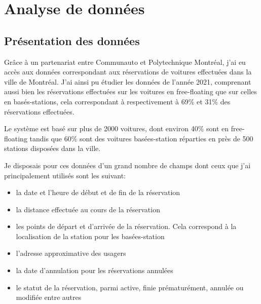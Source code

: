 \documentclass[12pt,a4paper]{article}
\newcommand{\1}[1]{\mathbbm{1}_{\{#1\}} }
\theoremstyle{definition}
\begin{document}
\section{Analyse de données}
\subsection{Présentation des données}

Grâce à un partenariat entre Communauto et Polytechnique Montréal, j'ai eu accès aux données correspondant aux réservations de voitures effectuées dans la ville de Montréal. 
J'ai ainsi pu étudier les données de l'année 2021, comprenant  aussi bien les réservations effectuées sur les voitures en free-floating que sur celles en basés-stations, cela correspondant à respectivement à 69\% et 31\% des réservations effectuées.


Le système est basé sur plus de 2000 voitures, dont environ 40\% sont en free-floating tandis que 60\% sont des voitures basées-station réparties en près de 500 stations disposées dans la ville.

Je disposais pour ces données d'un grand nombre de champs dont ceux que j'ai principalement utilisés sont les suivant:
\begin{itemize}
\item la date et l'heure de début et de fin de la réservation
\item la distance effectuée au cours de la réservation
\item les points de départ et d'arrivée de la réservation. Cela correspond à la localisation de la station pour les basées-station
\item l'adresse approximative des usagers
\item la date d'annulation pour les réservations annulées
\item le statut de la réservation, parmi active, finie prématurément, annulée ou modifiée entre autres
\end{itemize}
\end{document}
